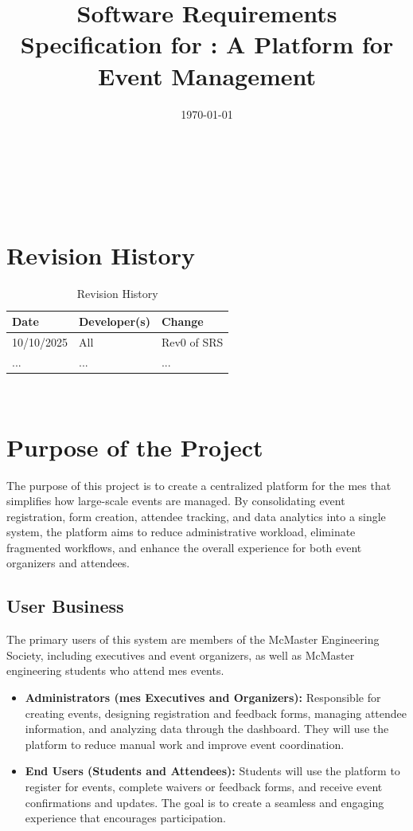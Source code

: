 \documentclass[12pt]{article}
\begin{document}
\title{Software Requirements Specification for \progname: A Platform for Event Management }
\author{\authname}
\date{\today}

\maketitle
~\newpage

\tableofcontents

~\newpage

\section*{Revision History}
\begin{table}[hp]
\caption{Revision History} \label{TblRevisionHistory}
\begin{tabularx}{\textwidth}{llX}
\toprule
\textbf{Date} & \textbf{Developer(s)} & \textbf{Change}\\
\midrule
10/10/2025 & All & Rev0 of SRS\\
... & ... & ...\\
\bottomrule
\end{tabularx}
\end{table}


~\newpage
\section{Purpose of the Project}

The purpose of this project is to create a centralized platform for the \gls{mes} that simplifies how large-scale events
are managed. By consolidating event registration, form creation, attendee tracking, and data analytics into a single
system, the platform aims to reduce administrative workload, eliminate fragmented workflows, and enhance the overall
experience for both event organizers and attendees.

\subsection{User Business}

The primary users of this system are members of the McMaster Engineering Society, including executives and event
organizers, as well as McMaster engineering students who attend \gls{mes} events.

\begin{itemize}
    \item \textbf{Administrators (\gls{mes} Executives and Organizers):} Responsible for creating events, designing
      registration and feedback forms, managing attendee information, and analyzing data through the dashboard. They
      will use the platform to reduce manual work and improve event coordination.
    \item \textbf{End Users (Students and Attendees):} Students will use the platform to register for events, complete
      waivers or feedback forms, and receive event confirmations and updates. The goal is to create a seamless and
      engaging experience that encourages participation.
\end{itemize}
\end{document}

